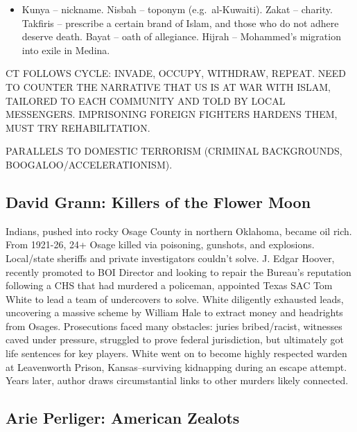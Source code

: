 \documentclass[
]{article}
\providecommand{\tightlist}{%
  \setlength{\itemsep}{0pt}\setlength{\parskip}{0pt}}
\begin{document}
\begin{itemize}
  \begin{itemize}
  \tightlist
  \item
    Kunya -- nickname. Nisbah -- toponym (e.g.~al-Kuwaiti). Zakat --
    charity. Takfiris -- prescribe a certain brand of Islam, and those
    who do not adhere deserve death. Bayat -- oath of allegiance. Hijrah
    -- Mohammed's migration into exile in Medina.
  \end{itemize}
\end{itemize}

CT FOLLOWS CYCLE: INVADE, OCCUPY, WITHDRAW, REPEAT. NEED TO COUNTER THE
NARRATIVE THAT US IS AT WAR WITH ISLAM, TAILORED TO EACH COMMUNITY AND
TOLD BY LOCAL MESSENGERS. IMPRISONING FOREIGN FIGHTERS HARDENS THEM,
MUST TRY REHABILITATION.

PARALLELS TO DOMESTIC TERRORISM (CRIMINAL BACKGROUNDS,
BOOGALOO/ACCELERATIONISM).

\hypertarget{david-grann-killers-of-the-flower-moon}{%
\subsection{David Grann: Killers of the Flower
Moon}\label{david-grann-killers-of-the-flower-moon}}

Indians, pushed into rocky Osage County in northern Oklahoma, became oil
rich. From 1921-26, 24+ Osage killed via poisoning, gunshots, and
explosions. Local/state sheriffs and private investigators couldn't
solve. J. Edgar Hoover, recently promoted to BOI Director and looking to
repair the Bureau's reputation following a CHS that had murdered a
policeman, appointed Texas SAC Tom White to lead a team of undercovers
to solve. White diligently exhausted leads, uncovering a massive scheme
by William Hale to extract money and headrights from Osages.
Prosecutions faced many obstacles: juries bribed/racist, witnesses caved
under pressure, struggled to prove federal jurisdiction, but ultimately
got life sentences for key players. White went on to become highly
respected warden at Leavenworth Prison, Kansas--surviving kidnapping
during an escape attempt. Years later, author draws circumstantial links
to other murders likely connected.

\hypertarget{arie-perliger-american-zealots}{%
\subsection{Arie Perliger: American
Zealots}\label{arie-perliger-american-zealots}}
\end{document}
